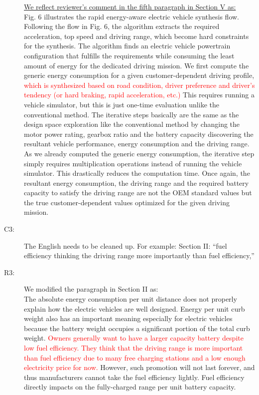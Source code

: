 \documentclass[onecolumn]{IEEEconf}
\begin{document}
\begin{description}
\underline{We reflect reviewer’s comment in the fifth paragraph in Section V as:}\\
Fig. 6 illustrates the rapid energy-aware electric vehicle synthesis flow. 
Following the flow in Fig. 6, the algorithm extracts the required acceleration, top speed and driving range, which become hard constraints for the synthesis. The algorithm finds an electric vehicle powertrain configuration that fulfills the requirements while consuming the least amount of energy for the dedicated driving mission. 
We first compute the generic energy consumption for a given customer-dependent driving profile, \textcolor{red}{which is synthesized based on road condition, driver preference and driver's tendency (or hard braking, rapid acceleration, etc.)} This requires running a vehicle simulator, but this is just one-time evaluation unlike the conventional method. The iterative steps basically are the same as the design space exploration like the conventional method by changing the motor power rating, gearbox ratio and the battery capacity discovering the resultant vehicle performance, energy consumption and the driving range. As we already computed the generic energy consumption, the iterative step simply requires multiplication operations instead of running the vehicle simulator. This drastically reduces the computation time. Once again, the resultant energy consumption, the driving range and the required battery capacity to satisfy the driving range are not the OEM standard values but the true customer-dependent values optimized for the given driving mission. 
~\\

\item [C3: ]  The English needs to be cleaned up. For example: Section II: “fuel efficiency thinking the driving range more importantly than fuel efficiency,”
\item [R3: ] We modified the paragraph in Section II as:\\

The absolute energy consumption per unit distance does not properly explain how the electric vehicles are well designed. 
Energy per unit curb weight also has an important meaning especially for electric vehicles because the battery weight occupies a significant portion of the total curb weight. 
\textcolor{red}{Owners generally want to have a larger capacity battery despite low fuel efficiency. They think that the driving range is more important than fuel efficiency due to many free charging stations and a low enough electricity price for now.}
However, such promotion will not last forever, and thus manufacturers cannot take the fuel efficiency lightly. Fuel efficiency directly impacts on the fully-charged range per unit battery capacity. \\
~\\


\end{description}
\end{document}
